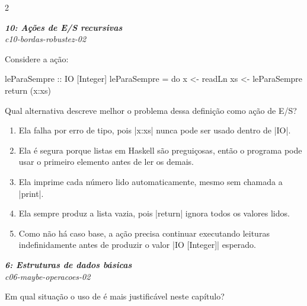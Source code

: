 \documentclass[a4paper,10pt,brazil]{article}
\begin{document}
\begin{multicols}{2}
\begin{flushright}
  \footnotesize
  \textit{\textbf{10: Ações de E/S recursivas}}\\
  \textit{c10-bordas-robustez-02}\\

\end{flushright}
Considere a ação:

\begin{haskellcode}
leParaSempre :: IO [Integer]
leParaSempre = do
  x <- readLn
  xs <- leParaSempre
  return (x:xs)
\end{haskellcode}

Qual alternativa descreve melhor o problema dessa definição como ação de E/S?

\begin{enumerate}
  \item Ela falha por erro de tipo, pois \haskellinline|x:xs| nunca pode ser usado dentro de \haskellinline|IO|.

  \item Ela é segura porque listas em Haskell são preguiçosas, então o programa pode usar o primeiro elemento antes de ler os demais.

  \item Ela imprime cada número lido automaticamente, mesmo sem chamada a \haskellinline|print|.

  \item Ela sempre produz a lista vazia, pois \haskellinline|return| ignora todos os valores lidos.

  \item Como não há caso base, a ação precisa continuar executando leituras indefinidamente antes de produzir o valor \haskellinline|IO [Integer]| esperado.


\end{enumerate}

\begin{flushright}
  \footnotesize
  \textit{\textbf{6: Estruturas de dados básicas}}\\
  \textit{c06-maybe-operacoes-02}\\

\end{flushright}
Em qual situação o uso de  é mais justificável neste capítulo?


\end{multicols}
\end{document}
